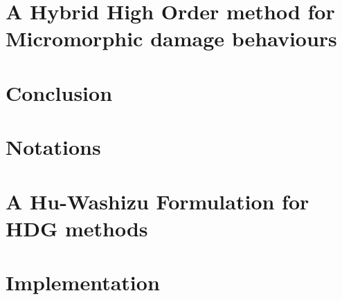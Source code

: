 \documentclass[a4paper, 11pt]{book}
\begin{document}
\chapter{A Hybrid High Order method for Micromorphic damage behaviours}







\chapter{Conclusion}



\appendix

\chapter{Notations}


\chapter{A Hu-Washizu Formulation for HDG methods}
% 


\chapter{Implementation}





\end{document}
